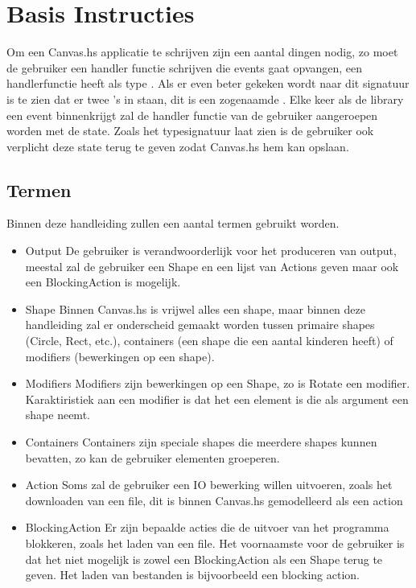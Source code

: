 \section{Basis Instructies}

Om een Canvas.hs applicatie te schrijven zijn een aantal dingen nodig, zo moet de gebruiker een handler functie schrijven die events gaat opvangen, een handlerfunctie heeft als type . Als er even beter gekeken wordt naar dit signatuur is te zien dat er twee 's in staan, dit is een zogenaamde . Elke keer als de library een event binnenkrijgt zal de handler functie van de gebruiker aangeroepen worden met de state. Zoals het typesignatuur laat zien is de gebruiker ook verplicht deze state terug te geven zodat Canvas.hs hem kan opslaan.

\subsection{Termen}
Binnen deze handleiding zullen een aantal termen gebruikt worden.
\begin{itemize}
	\item Output
De gebruiker is verandwoorderlijk voor het produceren van output, meestal zal de gebruiker een Shape en een lijst van Actions geven maar ook een BlockingAction is mogelijk.
	\item Shape
Binnen Canvas.hs is vrijwel alles een shape, maar binnen deze handleiding zal er onderscheid gemaakt worden tussen primaire shapes (Circle, Rect, etc.), containers (een shape die een aantal kinderen heeft) of modifiers (bewerkingen op een shape).
	\item Modifiers
Modifiers zijn bewerkingen op een Shape, zo is Rotate een modifier. Karaktiristiek aan een modifier is dat het een element is die als argument een shape neemt.
	\item Containers
Containers zijn speciale shapes die meerdere shapes kunnen bevatten, zo kan de gebruiker elementen groeperen.
	\item Action
Soms zal de gebruiker een IO bewerking willen uitvoeren, zoals het downloaden van een file, dit is binnen Canvas.hs gemodelleerd als een action
	\item BlockingAction
Er zijn bepaalde acties die de uitvoer van het programma blokkeren, zoals het laden van een file. Het voornaamste voor de gebruiker is dat het niet mogelijk is zowel een BlockingAction als een Shape terug te geven. Het laden van bestanden is bijvoorbeeld een blocking action.
\end{itemize}


